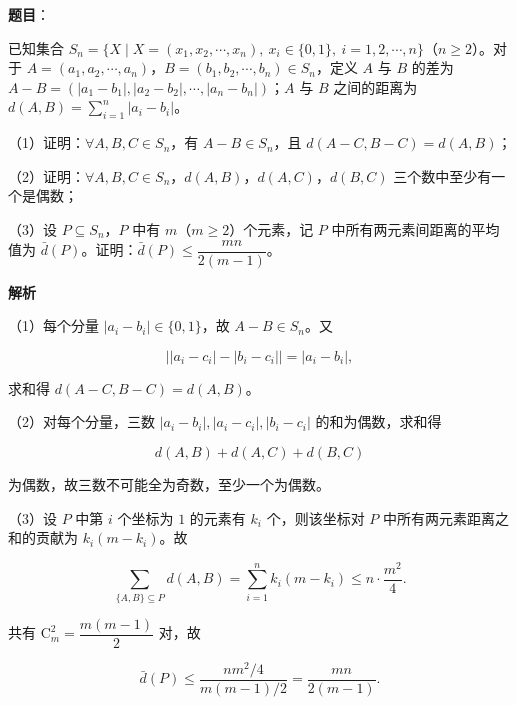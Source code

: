 \begin{answer}

\textbf{题目}：

已知集合 $S_n=\{X\mid X=(x_1,x_2,\cdots,x_n),\ x_i\in\{0,1\},\ i=1,2,\cdots,n\}$（$n\geqslant2$）。对于 $A=(a_1,a_2,\cdots,a_n)$，$B=(b_1,b_2,\cdots,b_n)\in S_n$，定义 $A$ 与 $B$ 的差为 $A-B=(|a_1-b_1|,|a_2-b_2|,\cdots,|a_n-b_n|)$；$A$ 与 $B$ 之间的距离为 $d(A,B)=\sum\limits_{i=1}^n|a_i-b_i|$。

（1）证明：$\forall A,B,C\in S_n$，有 $A-B\in S_n$，且 $d(A-C,B-C)=d(A,B)$；

（2）证明：$\forall A,B,C\in S_n$，$d(A,B)$，$d(A,C)$，$d(B,C)$ 三个数中至少有一个是偶数；

（3）设 $P\subseteq S_n$，$P$ 中有 $m$（$m\geqslant2$）个元素，记 $P$ 中所有两元素间距离的平均值为 $\bar d(P)$。证明：$\bar d(P)\leqslant\dfrac{mn}{2(m-1)}$。

\textbf{解析}

（1）每个分量 $|a_i-b_i|\in\{0,1\}$，故 $A-B\in S_n$。又

\nopagebreak[4]
\[\big||a_i-c_i|-|b_i-c_i|\big|=|a_i-b_i|,\]

求和得 $d(A-C,B-C)=d(A,B)$。

（2）对每个分量，三数 $|a_i-b_i|,|a_i-c_i|,|b_i-c_i|$ 的和为偶数，求和得

\nopagebreak[4]
\[d(A,B)+d(A,C)+d(B,C)\]

为偶数，故三数不可能全为奇数，至少一个为偶数。

（3）设 $P$ 中第 $i$ 个坐标为 $1$ 的元素有 $k_i$ 个，则该坐标对 $P$ 中所有两元素距离之和的贡献为 $k_i(m-k_i)$。故

\nopagebreak[4]
\[\sum_{\{A,B\}\subseteq P}d(A,B)
=\sum_{i=1}^n k_i(m-k_i)
\leqslant n\cdot\frac{m^2}4.\]

共有 $\mathrm C_m^2=\dfrac{m(m-1)}2$ 对，故

\nopagebreak[4]
\[\bar d(P)\leqslant\frac{n m^2/4}{m(m-1)/2}
=\frac{mn}{2(m-1)}.\]


\end{answer}